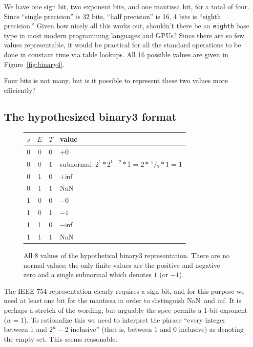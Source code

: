 \documentclass[twocolumn,cm]{article}
\newcommand\sfrac[2]{\!{}\,^{#1}\!/{}\!_{#2}}
\newcommand\nan{\textsf{NaN}}
\renewcommand\inf{\textsf{inf}}
\begin{document}
We have one sign bit, two exponent bits, and one mantissa bit, for a
total of four. Since ``single precision'' is 32 bits, ``half
precision'' is 16, 4 bits is ``eighth precision.'' Given how nicely
all this works out, shouldn't there be an {\tt eighth} base type in
most modern programming languages and GPUs? Since there are so few
values representable, it would be practical for all the standard
operations to be done in constant time via table lookups. All 16
possible values are given in Figure~\ref{fig:binary4}.

Four bits is not many, but is it possible to represent these two
values more efficiently?

\subsection{The hypothesized binary3 format} \label{sec:binary3}

\begin{figure}[ht]
\begin{center}
\begin{tabular}{|l@{\,}c@{\,}l|p{2.5in}|}
\hline
  $s$ & $E$ & $T$ & value \\
  \hline
0 & 0 & 0 &   $+0$ \\
0 & 0 & 1 &    subnormal: %
                $2^1 * 2^{1-2} * 1$ =
                $2 * \sfrac{1}{2} * 1$ = 1 \\
0 & 1 & 0 &   $+\inf$ \\
0 & 1 & 1 &    \nan \\
1 & 0 & 0 &   $-0$ \\
1 & 0 & 1 &   $-1$ \\
1 & 1 & 0 &   $-\inf$ \\
1 & 1 & 1 &    \nan \\
\hline
\end{tabular}
\caption{All 8 values of the hypothetical binary3 representation.
  There are no normal values; the only finite values are the
  positive and negative zero and a single subnormal which
  denotes $1$ (or $-1$).
} \label{fig:allvalues3}
\end{center}
\end{figure}

The IEEE 754 representation clearly requires a sign bit, and for this
purpose we need at least one bit for the mantissa in order to
distinguish \nan\ and \inf. It is perhaps a stretch of the wording,
but arguably the spec permits a 1-bit exponent ($w = 1$). To
rationalize this we need to interpret the phrase ``every integer
between $1$ and $2^w-2$ inclusive'' (that is, between 1 and 0 inclusive)
as denoting the empty set. This seems reasonable.
\end{document}

